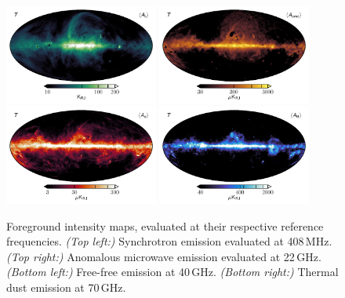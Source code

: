 \documentclass[twocolumn]{../../common/aa}
\begin{document}
\begin{figure}
	\centering
	\includegraphics[width=0.45\textwidth]{figures/synch_I.pdf}
	\includegraphics[width=0.45\textwidth]{figures/ame_I.pdf}\\
	\includegraphics[width=0.45\textwidth]{figures/dust_I.pdf}
	\includegraphics[width=0.45\textwidth]{figures/ff_I.pdf}\\
	\caption{Foreground intensity maps, evaluated at their respective reference frequencies. 
	\textit{(Top left:)} Synchrotron emission evaluated at 408\,MHz.
	\textit{(Top right:)} Anomalous microwave emission evaluated at 22\,GHz. 
	\textit{(Bottom left:)} Free-free emission at 40\,GHz. 
	\textit{(Bottom right:)} Thermal dust emission at 70\,GHz. 
	}\label{fig:intensity_foregrounds}
\end{figure}
\end{document}
